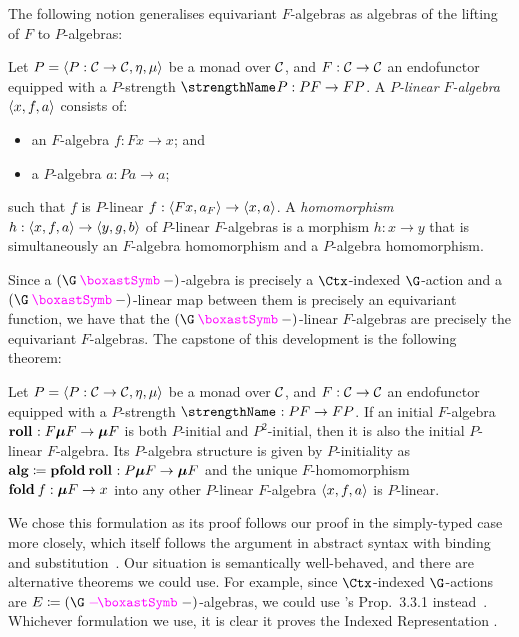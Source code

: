 The following notion generalises equivariant $F$-algebras as algebras
of the lifting of $F$ to $P$-algebras:
\begin{definition}
  Let $P = \left<{{P : \mathcal{C}\/ \to \mathcal{C}\/}, {\eta}, {\mu}}\right>$ be a monad over
  $\mathcal{C}\/$, and $F : \mathcal{C}\/ \to \mathcal{C}\/$ an endofunctor equipped with a
  $P$-strength $\strength P : PF \to FP$. A \emph{$P$-linear $F$-algebra}
  $\left<{{x}, {f}, {a}}\right>$ consists of:
  \begin{itemize}
  \item an $F$-algebra $f : Fx \to x$; and
  \item a $P$-algebra $a : Pa \to a$;
  \end{itemize}
  such that $f$ is $P$-linear $f : \left<{Fx}, {a_F}\right> \to \left<{x}, {a}\right>$. A
  \emph{homomorphism} $h : \left<{{x}, {f}, {a}}\right> \to \left<{{y}, {g}, {b}}\right>$ of $P$-linear
  $F$-algebras is a morphism $h : x \to y$ that is simultaneously an
  $F$-algebra homomorphism and a $P$-algebra homomorphism.
\end{definition}

Since a $(\gast-)$-algebra is precisely a $\Ctx$-indexed $\G$-action
and a $(\gast-)$-linear map between them is precisely an equivariant
function, we have that the $(\gast-)$-linear $F$-algebras are
precisely the equivariant $F$-algebras. The capstone of this
development is the following theorem:

\begin{theorem}%
  Let $P = \left<{{P : \mathcal{C}\/ \to \mathcal{C}\/}, {\eta}, {\mu}}\right>$ be a monad over
  $\mathcal{C}\/$, and $F : \mathcal{C}\/ \to \mathcal{C}\/$ an endofunctor equipped with a
  $P$-strength $\strength : PF \to FP$. If an initial $F$-algebra
  $\roll : F\fix F \to \fix F$ is both $P$-initial and $P^2$-initial,
  then it is also the initial $P$-linear $F$-algebra. Its $P$-algebra
  structure is given by $P$-initiality as
  \(
  \alg \definedby \pfold\roll : P\fix F \to \fix F
  \)
  and the unique $F$-homomorphism $\fold f : \fix F \to x$ into any
  other $P$-linear $F$-algebra $\left<{{x}, {f}, {a}}\right>$ is $P$-linear.
\end{theorem}

We chose this formulation as its proof follows our proof in the
simply-typed case more closely, which itself follows the argument in
abstract syntax with binding and
substitution~\cite{fiore-plotkin-turi:ast}. Our situation is
semantically well-behaved, and there are alternative theorems we could
use. For example, since $\Ctx$-indexed $\G$-actions are $E \definedby
(\lollybox-)$-algebras, we could use
\citeauthor{szamozvancev:thesis}'s Prop.~3.3.1
instead~\cite{fiore-szamozvancev:soas-theory}. Whichever formulation
we use, it is clear it proves the Indexed Representation
.

